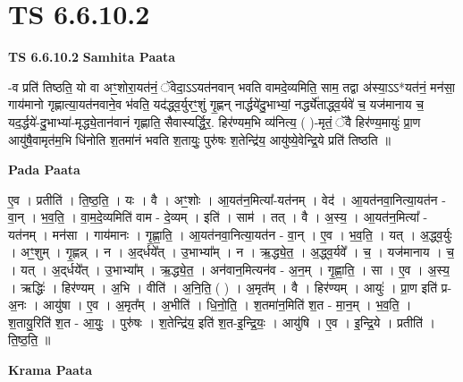 \documentclass[17pt]{extarticle}
\begin{document}
\section{ TS 6.6.10.2 }

\textbf{TS 6.6.10.2 } \newline
\textbf{Samhita Paata} \newline

-व प्रति॑ तिष्ठति॒ यो वा अꣳ॒॒शोरा॒यत॑नं॒ ॅवेदा॒ऽऽयत॑नवान् भवति वामदे॒व्यमिति॒ साम॒ तद्वा अ॑स्या॒ऽऽ*यत॑नं॒ मन॑सा॒ गाय॑मानो गृह्णात्या॒यत॑नवाने॒व भ॑वति॒ यद॑द्ध्व॒र्युरꣳ॒॒शुं गृ॒ह्णन् नार्द्धये॑दु॒भाभ्यां॒ नर्द्ध्ये॑ताद्ध्व॒र्यवे॑ च॒ यज॑मानाय च॒ यद॒र्द्धये॑-दु॒भाभ्या॑-मृद्ध्ये॒तान॑वानं गृह्णाति॒ सैवास्यर्द्धि॒र॒. हिर॑ण्यम॒भि व्य॑नित्य॒ ( )-मृतं॒ ॅवै हिर॑ण्य॒मायुः॑ प्रा॒ण आयु॑षै॒वामृत॑म॒भि धि॑नोति श॒तमा॑नं भवति श॒तायुः॒ पुरु॑षः श॒तेन्द्रि॑य॒ आयु॑ष्ये॒वेन्द्रि॒ये प्रति॑ तिष्ठति ॥ \newline

\textbf{Pada Paata} \newline

ए॒व । प्रतीति॑ । ति॒ष्ठ॒ति॒ । यः । वै । अꣳ॒॒शोः । आ॒यत॑न॒मित्या᳚-यत॑नम् । वेद॑ । आ॒यत॑नवा॒नित्या॒यत॑न - वा॒न् । भ॒व॒ति॒ । वा॒म॒दे॒व्यमिति॑ वाम - दे॒व्यम् । इति॑ । साम॑ । तत् । वै । अ॒स्य॒ । आ॒यत॑न॒मित्या᳚ - यत॑नम् । मन॑सा । गाय॑मानः । गृ॒ह्णा॒ति॒ । आ॒यत॑नवा॒नित्या॒यत॑न - वा॒न् । ए॒व । भ॒व॒ति॒ । यत् । अ॒द्ध्व॒र्युः । अꣳ॒॒शुम् । गृ॒ह्णन्न् । न । अ॒द्‌र्धये᳚त् । उ॒भाभ्या᳚म् । न । ऋ॒द्ध्ये॒त॒ । अ॒द्ध्व॒र्यवे᳚ । च॒ । यज॑मानाय । च॒ । यत् । अ॒द्‌र्धये᳚त् । उ॒भाभ्या᳚म् । ऋ॒द्ध्ये॒त॒ । अन॑वान॒मित्यन॑व - अ॒न॒म् । गृ॒ह्णा॒ति॒ । सा । ए॒व । अ॒स्य॒ । ऋद्धिः॑ । हिर॑ण्यम् । अ॒भि । वीति॑ । अ॒नि॒ति॒ ( ) । अ॒मृत᳚म् । वै । हिर॑ण्यम् । आयुः॑ । प्रा॒ण इति॑ प्र-अ॒नः । आयु॑षा । ए॒व । अ॒मृत᳚म् । अ॒भीति॑ । धि॒नो॒ति॒ । श॒तमा॑न॒मिति॑ श॒त - मा॒न॒म् । भ॒व॒ति॒ । श॒तायु॒रिति॑ श॒त - आ॒युः॒ । पुरु॑षः । श॒तेन्द्रि॑य॒ इति॑ श॒त-इ॒न्द्रि॒यः॒ । आयु॑षि । ए॒व । इ॒न्द्रि॒ये । प्रतीति॑ । ति॒ष्ठ॒ति॒ ॥  \newline


\textbf{Krama Paata} \newline
\end{document}
